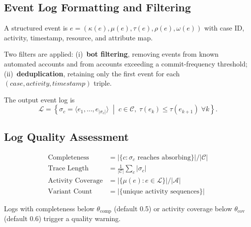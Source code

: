 \subsection{Event Log Formatting and Filtering}
\label{sec:s1-formatting}

\begin{definition}
\label{def:structured-event}
A structured event is
$e = (\kappa(e), \mu(e), \tau(e), \rho(e), \omega(e))$ with case ID,
activity, timestamp, resource, and attribute map.
\end{definition}

Two filters are applied: (i)~\textbf{bot filtering}, removing events from
known automated accounts and from accounts exceeding a commit-frequency
threshold; (ii)~\textbf{deduplication}, retaining only the first event for
each $(case, activity, timestamp)$ triple.

The output event log is
\begin{equation}
\label{eq:final-log}
\mathcal{L} = \left\{ \sigma_c = \langle e_1, \ldots, e_{|\sigma_c|} \rangle
    \;\middle|\; c \in \mathcal{C}, \;
    \tau(e_k) \leq \tau(e_{k+1}) \; \forall k \right\}.
\end{equation}


\subsection{Log Quality Assessment}
\label{sec:s1-quality}

\begin{definition}
\label{def:log-quality}
\begin{align}
\text{Completeness}      &= |\{c : \sigma_c \text{ reaches absorbing}\}| / |\mathcal{C}| \label{eq:log-completeness} \\
\text{Trace Length}      &= \tfrac{1}{|\mathcal{C}|} \sum_c |\sigma_c| \label{eq:trace-length} \\
\text{Activity Coverage} &= |\{\mu(e) : e \in \mathcal{L}\}| / |\mathcal{A}| \label{eq:activity-coverage} \\
\text{Variant Count}     &= |\{\text{unique activity sequences}\}| \label{eq:variant-count}
\end{align}
\end{definition}

Logs with completeness below $\theta_{\text{comp}}$ (default 0.5) or
activity coverage below $\theta_{\text{cov}}$ (default 0.6) trigger a
quality warning.


